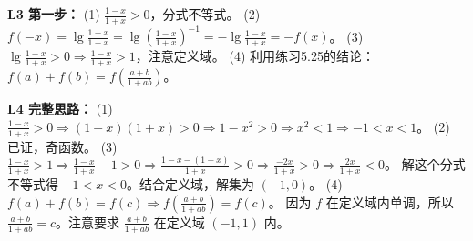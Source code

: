 \textbf{L3 第一步：}
(1) \(\frac{1-x}{1+x} > 0\)，分式不等式。
(2) \(f(-x) = \lg\frac{1+x}{1-x} = \lg\left(\frac{1-x}{1+x}\right)^{-1} = -\lg\frac{1-x}{1+x} = -f(x)\)。
(3) \(\lg\frac{1-x}{1+x} > 0 \Rightarrow \frac{1-x}{1+x} > 1\)，注意定义域。
(4) 利用练习5.25的结论：\(f(a)+f(b) = f\left(\frac{a+b}{1+ab}\right)\)。

\textbf{L4 完整思路：}
(1) \(\frac{1-x}{1+x} > 0 \Rightarrow (1-x)(1+x) > 0 \Rightarrow 1 - x^2 > 0 \Rightarrow x^2 < 1 \Rightarrow -1 < x < 1\)。
(2) 已证，奇函数。
(3) \(\frac{1-x}{1+x} > 1 \Rightarrow \frac{1-x}{1+x} - 1 > 0 \Rightarrow \frac{1-x-(1+x)}{1+x} > 0 \Rightarrow \frac{-2x}{1+x} > 0 \Rightarrow \frac{2x}{1+x} < 0\)。
解这个分式不等式得 \(-1 < x < 0\)。结合定义域，解集为 \((-1, 0)\)。
(4) \(f(a)+f(b) = f(c) \Rightarrow f\left(\frac{a+b}{1+ab}\right) = f(c)\)。
因为 \(f\) 在定义域内单调，所以 \(\frac{a+b}{1+ab} = c\)。注意要求 \(\frac{a+b}{1+ab}\) 在定义域 \((-1,1)\) 内。
